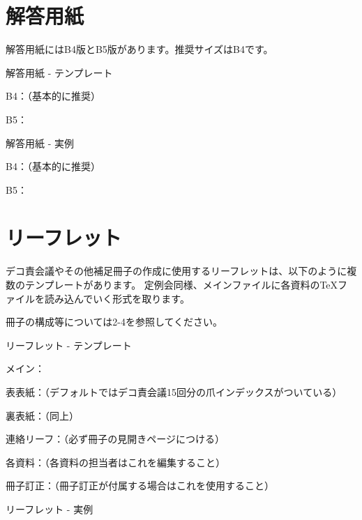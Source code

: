\begin{multicols*}{2}
\section{解答用紙}
解答用紙にはB4版とB5版があります。推奨サイズはB4です。
\begin{framebox-simple}{解答用紙 - テンプレート}
    \begin{reitemize}
        \item B4：（基本的に推奨）
        \item B5：
    \end{reitemize}
\end{framebox-simple}
\begin{framebox-simple}{解答用紙 - 実例}
    \begin{reitemize}
        \item B4：（基本的に推奨）
        \item B5：
    \end{reitemize}
\end{framebox-simple}

\section{リーフレット}
デコ責会議やその他補足冊子の作成に使用するリーフレットは、以下のように複数のテンプレートがあります。
定例会同様、メインファイルに各資料の\TeX ファイルを読み込んでいく形式を取ります。

冊子の構成等については2-4を参照してください。
\begin{framebox-simple}{リーフレット - テンプレート}
    \begin{reitemize}
        \item メイン：
        \item 表表紙：（デフォルトではデコ責会議15回分の爪インデックスがついている）
        \item 裏表紙：（同上）
        \item 連絡リーフ：（必ず冊子の見開きページにつける）
        \item 各資料：（各資料の担当者はこれを編集すること）
        \item 冊子訂正：（冊子訂正が付属する場合はこれを使用すること）
    \end{reitemize}
\end{framebox-simple}
\begin{framebox-simple}{リーフレット - 実例}
    \begin{reitemize}
        \item {}
        \item {}
    \end{reitemize}
\end{framebox-simple}


\end{multicols*}
